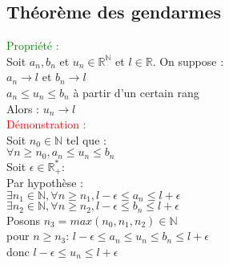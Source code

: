 \documentclass{article}
\begin{document}
\subsection{Théorème des gendarmes}
\textcolor{green}{Propriété :} \\ 
Soit $a_n, b_n$ et $u_n \in \mathbb{R}^\mathbb{N}$ et $l \in \mathbb{R}$. On suppose : \\ 
$a_n \rightarrow l$ et $b_n \rightarrow l$ \\ 
$a_n \leq u_n \leq b_n$ à partir d'un certain rang \\ 
Alors : $u_n \rightarrow l$ \\ 
\textcolor{red}{Démonstration :} \\ 
Soit $n_0 \in \mathbb{N}$ tel que : \\ 
$\forall n \geq n_0, a_n\leq u_n \leq b_n$ \\ 
Soit $ \epsilon \in \mathbb{R}^*_+$: \\ 
Par hypothèse : \\ 
$\exists n_1 \in \mathbb{N}, \forall n \geq n_1, l- \epsilon \leq a_n \leq l+\epsilon$ \\ 
$\exists n_2 \in \mathbb{N}, \forall n \geq n_2, l- \epsilon \leq b_n \leq l+\epsilon$ \\ 
Posons $n_3=max(n_0,n_1,n_2) \in \mathbb{N}$ \\ 
pour $n \geq n_3$: $l- \epsilon \leq a_n \leq u_n \leq b_n \leq l+ \epsilon$ \\ 
donc $l- \epsilon \leq u_n \leq l+ \epsilon$
\end{document}
